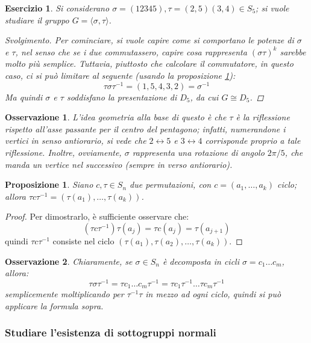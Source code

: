 \documentclass[11pt]{scrartcl}
\theoremstyle{style}
\newtheorem{prop}{Proposizione}[section]
\newtheorem{osservazione}{Osservazione}[section]
\newtheorem{esercizio}{Esercizio}[section]
\newenvironment{svolgimento}{\renewcommand\qedsymbol{$\blacksquare$}\begin{proof}[Svolgimento]}{\end{proof}}
\numberwithin{equation}{subsection}
\begin{document}
\begin{esercizio}
	Si considerano $\sigma = (12345), \tau =(2,5)(3,4) \in S_5$; si vuole studiare il gruppo $G = \langle \sigma ,\tau  \rangle$.
	\begin{svolgimento}
		Per cominciare, si vuole capire come si comportano le potenze di $\sigma $ e $\tau $, nel senso che se i due commutassero, capire cosa rappresenta $(\sigma \tau )^k$ sarebbe molto pi\`u semplice.
		Tuttavia, piuttosto che calcolare il commutatore, in questo caso, ci si pu\`o limitare al seguente (usando la proposizione \ref{congperm}):
		\[
		\tau \sigma \tau ^{-1} = (1,5,4,3,2) = \sigma ^{-1}
		\] 
		Ma quindi $\sigma $ e $\tau $ soddisfano la presentazione di $D_5$, da cui $G \cong D_5$.
	\end{svolgimento}
\end{esercizio}
\begin{osservazione}
L'idea geometria alla base di questo \`e che $\tau $ \`e la riflessione rispetto all'asse passante per il centro del pentagono; infatti, numerandone i vertici in senso antiorario, si vede che $2\leftrightarrow 5$ e $3\leftrightarrow 4$ corrisponde proprio a tale riflessione.
Inoltre, ovviamente, $\sigma $ rappresenta una rotazione di angolo $2\pi / 5$, che manda un vertice nel successivo (sempre in verso antiorario).
\end{osservazione}
\begin{prop}
	\label{congperm}
	Siano $c ,\tau \in S_n$ due permutazioni, con $c = (a_1, \ldots, a_k)$ ciclo; allora $\tau c \tau ^{-1}= (\tau (a_1),\ldots, \tau (a_k))$.
\end{prop}
	\begin{proof}
		Per dimostrarlo, \`e sufficiente osservare che:
		\[
			(\tau c \tau ^{-1}) \tau (a_j) = \tau c (a_j)= \tau (a_{j+1} )
		\] 
		quindi $\tau c \tau ^{-1}$ consiste nel ciclo $(\tau (a_1), \tau (a_2) ,\ldots, \tau (a_k))$.
	\end{proof}
\begin{osservazione}
Chiaramente, se $\sigma \in S_n$ \`e decomposta in cicli $\sigma = c_1\ldots c_m$, allora:
\[
\tau \sigma \tau ^{-1}=\tau c_1 \ldots c_m \tau ^{-1}=\tau c_1 \tau ^{-1}\ldots \tau c_m \tau ^{-1}
\] 
semplicemente moltiplicando per $\tau ^{-1}\tau $ in mezzo ad ogni ciclo, quindi si pu\`o applicare la formula sopra.
\end{osservazione}
\subsubsection{Studiare l'esistenza di sottogruppi normali}
\end{document}
